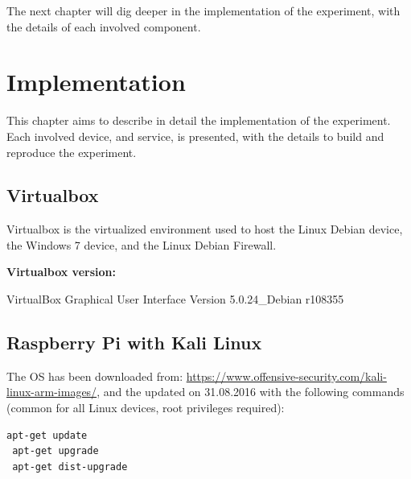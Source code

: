 \documentclass[12pt]{article}
\begin{document}
The next chapter will dig deeper in the implementation of the experiment, with the details of each involved component.




\pagebreak

\section{Implementation}
\label{sec:4}

This chapter aims to describe in detail the implementation of the experiment. Each involved device, and service, is presented, with the details to build and reproduce the experiment.

\subsection{Virtualbox}

Virtualbox is the virtualized environment used to host the Linux Debian device, the Windows 7 device, and the Linux Debian Firewall.

\textbf{Virtualbox version:} 

\vspace{-15pt}
VirtualBox Graphical User Interface Version 5.0.24_Debian r108355

\subsection{Raspberry Pi with Kali Linux}


\begin{savenotes}
\begin{table}[!htpb]
\centering
\addtolength{\tabcolsep}{1pt}
\noindent{}
\caption{Raspberry Pi implementation}
\label{table:raspImpl}
\end{table}
\end{savenotes}

The OS has been downloaded from: \url{https://www.offensive-security.com/kali-linux-arm-images/}, and the updated on 31.08.2016 with the following commands (common for all Linux devices, root privileges required):
\begin{lstlisting}[style=python,basicstyle=\ttfamily\scriptsize]
 apt-get update
 apt-get upgrade
 apt-get dist-upgrade
\end{lstlisting}
\end{document}
